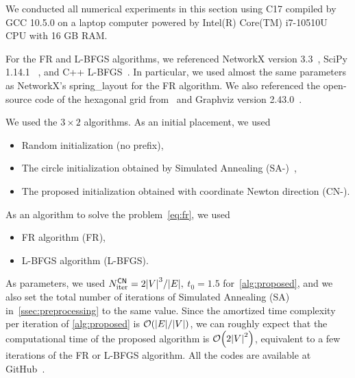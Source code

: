 \documentclass[dvipdfmx,10pt,journal,compsoc]{IEEEtran}
\newcommand{\Cpp}{C\nolinebreak[4]\hspace{-.05em}\raisebox{.4ex}{\relsize{-3}{\textbf{++}}}}
\begin{document}
We conducted all numerical experiments in this section using \Cpp17 compiled by GCC 10.5.0 on a laptop computer powered by Intel(R) Core(TM) i7-10510U CPU with 16 GB RAM.

For the FR and L-BFGS algorithms, we referenced NetworkX version 3.3~\cite{hagberg2008exploring}, SciPy 1.14.1 ~\cite{2020SciPy-NMeth}, and C++ L-BFGS~\cite{qiuYixuanLBFGSpp2024,okazakiChokkanLiblbfgs2024}. In particular, we used almost the same parameters as NetworkX's \textsf{spring\_layout} for the FR algorithm.
We also referenced the open-source code of the hexagonal grid from~\cite{patelHexagonalGrids2013} and Graphviz version 2.43.0~\cite{ellsonGraphvizOpenSource2002}.

We used the $3 \times 2$ algorithms.
As an initial placement, we used
\begin{itemize}
  \item Random initialization (no prefix),
  \item The circle initialization obtained by Simulated Annealing (\textsf{SA-})~\cite{ghassemitoosiSimulatedAnnealingPreProcessing2016},
  \item The proposed initialization obtained with coordinate Newton direction (\textsf{CN-}).
\end{itemize}
As an algorithm to solve the problem~\eqref{eq:fr}, we used
\begin{itemize}
  \item FR algorithm (\textsf{FR}),
  \item L-BFGS algorithm (\textsf{L-BFGS}).
\end{itemize}

As parameters, we used $N_\mathrm{iter}^\mathsf{CN} = 2 \abs{V}^3 / \abs{E},$ $t_0=1.5$ for~\cref{alg:proposed}, and we also set the total number of iterations of Simulated Annealing (\textsf{SA}) in~\cref{ssec:preprocessing} to the same value.
Since the amortized time complexity per iteration of \cref{alg:proposed} is $\order{\abs{E} / \abs{V}}$, we can roughly expect that the computational time of the proposed algorithm is $\order{2\abs{V}^2}$, equivalent to a few iterations of the FR or L-BFGS algorithm.
All the codes are available at GitHub~\cite{ThisPaperGitHub}.
\end{document}
